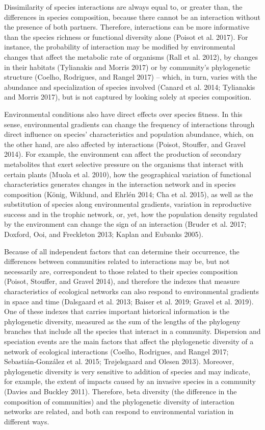 \documentclass[11pt]{article}
\begin{document}
Dissimilarity of species interactions are always equal to, or greater
than, the differences in species composition, because there cannot be an
interaction without the presence of both partners. Therefore,
interactions can be more informative than the species richness or
functional diversity alone (Poisot et al. 2017). For instance, the
probability of interaction may be modified by environmental changes that
affect the metabolic rate of organisms (Rall et al. 2012), by changes in
their habitats (Tylianakis and Morris 2017) or by community's
phylogenetic structure (Coelho, Rodrigues, and Rangel 2017) -- which, in
turn, varies with the abundance and specialization of species involved
(Canard et al. 2014; Tylianakis and Morris 2017), but is not captured by
looking solely at species composition.

Environmental conditions also have direct effects over species fitness.
In this sense, environmental gradients can change the frequency of
interactions through direct influence on species' characteristics and
population abundance, which, on the other hand, are also affected by
interactions (Poisot, Stouffer, and Gravel 2014). For example, the
environment can affect the production of secondary metabolites that
exert selective pressure on the organisms that interact with certain
plants (Muola et al. 2010), how the geographical variation of functional
characteristics generates changes in the interaction network and in
species composition (König, Wiklund, and Ehrlén 2014; Cha et al. 2015),
as well as the substitution of species along environmental gradients,
variation in reproductive success and in the trophic network, or, yet,
how the population density regulated by the environment can change the
sign of an interaction (Bruder et al. 2017; Doxford, Ooi, and Freckleton
2013; Kaplan and Eubanks 2005).

Because of all independent factors that can determine their occurrence,
the differences between communities related to interactions may be, but
not necessarily are, correspondent to those related to their species
composition (Poisot, Stouffer, and Gravel 2014), and therefore the
indexes that measure characteristics of ecological networks can also
respond to environmental gradients in space and time (Dalsgaard et al.
2013; Baiser et al. 2019; Gravel et al. 2019). One of these indexes that
carries important historical information is the phylogenetic diversity,
measured as the sum of the lengths of the phylogeny branches that
include all the species that interact in a community. Dispersion and
speciation events are the main factors that affect the phylogenetic
diversity of a network of ecological interactions (Coelho, Rodrigues,
and Rangel 2017; Sebastián-González et al. 2015; Trøjelsgaard and Olesen
2013). Moreover, phylogenetic diversity is very sensitive to addition of
species and may indicate, for example, the extent of impacts caused by
an invasive species in a community (Davies and Buckley 2011). Therefore,
beta diversity (the difference in the composition of communities) and
the phylogenetic diversity of interaction networks are related, and both
can respond to environmental variation in different ways.
\end{document}
